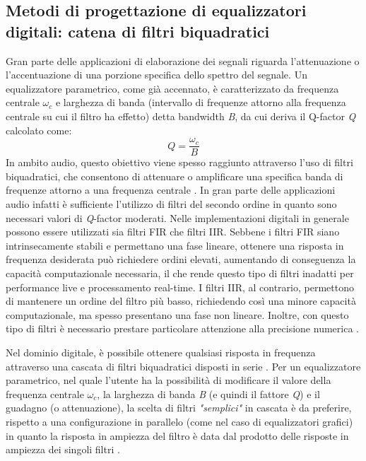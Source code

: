 \documentclass[12pt]{report}
\begin{document}
\subsection{Metodi di progettazione di equalizzatori digitali: catena di filtri biquadratici}
Gran parte delle applicazioni di elaborazione dei segnali riguarda l'attenuazione o l'accentuazione di una porzione specifica dello spettro del segnale.
Un equalizzatore parametrico, come già accennato, è caratterizzato da frequenza centrale \(\omega_c\) e larghezza di banda (intervallo di frequenze attorno alla frequenza centrale su cui il filtro ha effetto) detta bandwidth \textit{B}, da cui deriva il Q-factor \textit{Q} calcolato come:
\begin{equation}
    \textit{Q}=\frac{\omega_c}{\textit{B}}
    \label{eq:q-factor}
\end{equation}
In ambito audio, questo obiettivo viene spesso raggiunto attraverso l’uso di filtri biquadratici, che consentono di attenuare o amplificare una specifica banda di frequenze attorno a una frequenza centrale \parencite{reiss2010design}.
In gran parte delle applicazioni audio infatti è sufficiente l'utilizzo di filtri del secondo ordine in quanto sono necessari valori di \textit{Q}-factor moderati. Nelle implementazioni digitali in generale possono essere utilizzati sia filtri FIR che filtri IIR. Sebbene i filtri FIR siano intrinsecamente stabili e permettano una fase lineare, ottenere una risposta in frequenza desiderata può richiedere ordini elevati, aumentando di conseguenza la capacità computazionale necessaria, il che rende questo tipo di filtri inadatti per performance live e processamento real-time.
I filtri IIR, al contrario, permettono di mantenere un ordine del filtro più basso, richiedendo così una minore capacità computazionale, ma spesso presentano una fase non lineare. Inoltre, con questo tipo di filtri è necessario prestare particolare attenzione alla precisione numerica \parencite{shpak1991analytical}.

Nel dominio digitale, è possibile ottenere qualsiasi risposta in frequenza attraverso una cascata di filtri biquadratici disposti in serie \parencite{reiss2010design}. Per un equalizzatore parametrico, nel quale l'utente ha la possibilità di modificare il valore della frequenza centrale \(\omega_c\), la larghezza di banda \textit{B} (e quindi il fattore \textit{Q}) e il guadagno (o attenuazione), la scelta di filtri \textit{"semplici"} in cascata è da preferire, rispetto a una configurazione in parallelo (come nel caso di equalizzatori grafici) in quanto la risposta in ampiezza del filtro è data dal prodotto delle risposte in ampiezza dei singoli filtri \parencite{shpak1991analytical}.
\end{document}
